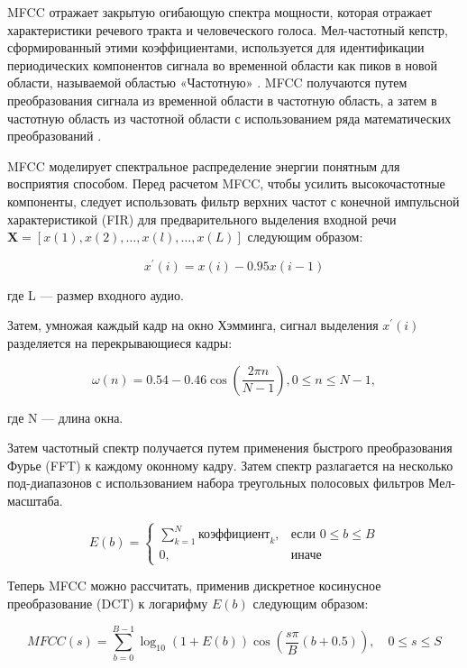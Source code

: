 MFCC отражает закрытую огибающую спектра мощности, которая отражает характеристики речевого тракта и человеческого голоса. Мел-частотный кепстр, сформированный этими коэффициентами, используется для идентификации периодических компонентов сигнала во временной области как пиков в новой области, называемой областью «Частотную» \cite{mfcc-01}. MFCC получаются путем преобразования сигнала из временной области в частотную область, а затем в частотную область из частотной области с использованием ряда математических преобразований \cite{mfcc-02}.

MFCC моделирует спектральное распределение энергии понятным для восприятия способом. Перед расчетом MFCC, чтобы усилить высокочастотные компоненты, следует использовать фильтр верхних частот с конечной импульсной характеристикой (FIR) для предварительного выделения входной речи \(\mathbf{X} = [x(1), x(2), \ldots, x(l), \ldots, x(L)]\) следующим образом:

\begin{equation}
    {x^'}(i) = x(i) - 0.95x(i-1)
\end{equation}

где L — размер входного аудио.

Затем, умножая каждый кадр на окно Хэмминга, сигнал выделения \({x^'}(i)\) разделяется на перекрывающиеся кадры:

\begin{equation}
    \omega(n) = 0.54 - 0.46 \cos(\frac{2 \pi n}{N - 1}), 0 \leq n \leq N - 1,
\end{equation}

где N — длина окна.

Затем частотный спектр получается путем применения быстрого преобразования Фурье (FFT) к каждому оконному кадру. Затем спектр разлагается на несколько под-диапазонов с использованием набора треугольных полосовых фильтров Мел-масштаба.

\begin{equation}
    E(b) = \left\{
    \begin{array}{ll}
    \sum_{k=1}^{N} \text{коэффициент}_k, & \text{если } 0 \leq b \leq B \\
    0, & \text{иначе}
    \end{array}
    \right.
\end{equation}

Теперь MFCC можно рассчитать, применив дискретное косинусное преобразование (DCT) к логарифму \(E(b)\) следующим образом:

\begin{equation}
    MFCC(s) = \sum_{b=0}^{B-1} \log_{10}(1 + E(b)) \cos\left(\frac{s\pi}{B} (b + 0.5)\right), \quad 0 \leq s \leq S
\end{equation}

